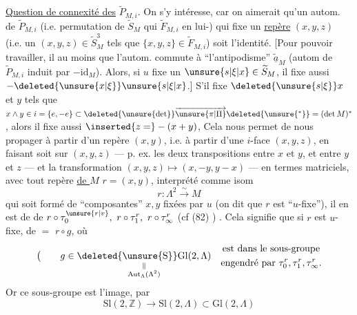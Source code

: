 \uline{Question de connexité des} $\widetilde P_{M,i}$. On s'y intéresse, car on aimerait qu'un autom. de $\widetilde P_{M,i}$ (i.e. permutation de $\widetilde S_M$ qui  $\widetilde F_{M,i}$ en lui-) qui fixe un \uline{repère} $(x,y,z)$ (i.e. un $(x,y,z)\in\widetilde S_M^3$ tels que $\{x,y,z\}\in\widetilde F_{M,i}$) soit l'identité.
[Pour pouvoir travailler, il  au moins que l'autom. commute à ``l'antipodisme'' \deleted{\unsure{$\varepsilon$|$\in$}} $\underline{\widetilde a}_M$ (autom de $\widetilde P_{M,i}$ induit par $-\mathrm{id}_M$). Alors, si $u$ fixe un $\unsure{s|\xi|x}\in\widetilde S_M$,
il fixe aussi $-\deleted{\unsure{x|\xi}}\unsure{s|\xi|x}$.] S'il fixe $\deleted{\unsure{s|\xi}}x$ et $y$ tels que $x\wedge y\in i=\{e,-e\}\subset\deleted{\unsure{\det}}\overrightarrow{\unsure{\pi|\Pi}}\deleted{\unsure{{}^*}}=(\det M)^*$, alors il fixe aussi $\inserted{z=}-(x+y)$,  Cela nous permet de nous propager à partir d'un repère $(x,y)$,   i.e. à partir d'une $i$-face $(x,y,z)$, en faisant soit  sur $(x,y,z)$ --- p. ex. les deux transpositions entre $x$ et $y$, et entre $y$ et $z$ --- et la transformation $(x,y,z)\longmapsto(x,-y,y-x)$ ---
en termes matriciels, avec tout repère \uline{de $M$} $r=(x,y)$, interprété comme isom
\[
 r:\Lambda^2\xrightarrow{\sim}M
\]
qui soit formé de ``composantes'' $x,y$ fixées par $u$ (on dit que $r$ est ``$u$-fixe''), il en est de  de $r\circ\tau_0^{\unsure{r|v}},\ r\circ\tau_1^r,\ r\circ\tau_\infty^r$ (cf (82) ) .
Cela signifie que si $r$ est $u$-fixe, de $=$ $r\circ g$, où
\[
 \bigl(\qquad g\in\underset{\substack{\Vert\\\operatorname{Aut}_\Lambda(\Lambda^2)}}{\mathrm{\deleted{\unsure{S}}Gl}(2,\Lambda)}
 \quad\begin{gathered}\text{est dans le sous-groupe}\\\text{engendré par }\tau_0^r,\tau_1^r,\tau_\infty^r.\end{gathered}
\]
Or ce sous-groupe est l'image, par
\[
 \mathrm{Sl}(2,\mathbb Z)\longrightarrow\mathrm{Sl}(2,\Lambda)\subset\mathrm{Gl}(2,\Lambda)
\]
